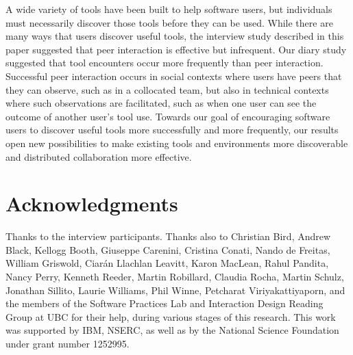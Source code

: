 \documentclass[smallextended]{svjour3}
\newcommand\discovery{peer interaction\xspace}
\newcommand\idrg[1]{\nb{IDRG}{#1}}
\begin{document}
\noindent
A wide variety of tools have been built to help software users, but individuals
must necessarily discover those tools before they can be used.
While there are many ways that users discover useful tools, 
the interview study described in this paper suggested that
\discovery is effective but infrequent. 
Our diary study suggested that tool encounters occur
more frequently than \discovery.
Successful \discovery occurs in social contexts where users have 
peers that they can observe, such as in a collocated team, 
but also in technical contexts where such observations are 
facilitated, such as when one user can see the outcome of another
user's tool use.
Towards our goal of encouraging software users to 
discover useful tools more successfully and more frequently,
our results open new possibilities to make existing tools and environments more
discoverable and distributed collaboration more effective.


\idrg{page numbers}

\section*{Acknowledgments}

\noindent
Thanks to the interview participants.
Thanks also to
Christian Bird,
Andrew Black,
Kellogg Booth,
Giuseppe Carenini,
Cristina Conati,
Nando de Freitas,
William Griswold,
Ciar\'an Llachlan Leavitt,
Karon MacLean,
Rahul Pandita,
Nancy Perry,
Kenneth Reeder,
Martin Robillard,
Claudia Rocha,
Martin Schulz,
Jonathan Sillito,
Laurie Williams,
Phil Winne,
Petcharat Viriyakattiyaporn,
and the members of the Software Practices Lab and
Interaction Design Reading Group at UBC
for their help, during various stages of this research.
This work was supported by IBM, NSERC,
as well as 
by the National Science Foundation under grant number 1252995.
\end{document}
